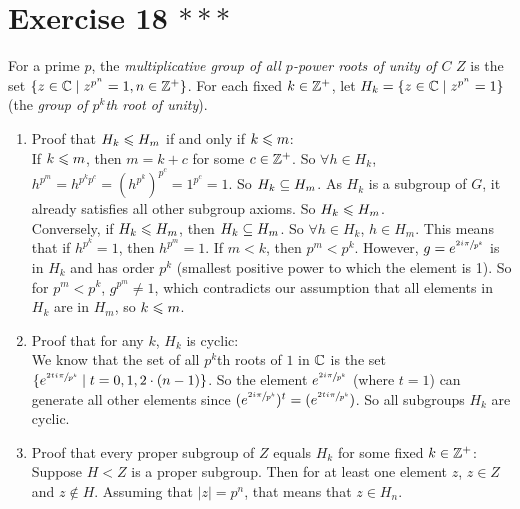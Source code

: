 \documentclass[12pt]{article}
\begin{document}
    \section*{Exercise 18 $***$}
    For a prime $p$,
    the \textit{multiplicative group of all $p$-power roots of unity of $C$}
    $Z$ is the set $\{z \in \mathbb{C} \mid z^{p^n} = 1, n \in \mathbb{Z}^+\}$.
    For each fixed $k \in \mathbb{Z}^+$, let $H_k = \{z \in \mathbb{C} \mid z^{p^n} = 1\}$
    (the \textit{group of $p^k$th root of unity}).
    \begin{enumerate}[label=\textbf{\alph*.}]
        \item
            Proof that $H_k \leqslant H_m$ if and only if $k \leqslant m$: \\
            If $k \leqslant m$, then $m = k + c$ for some $c \in \mathbb{Z}^+$.
            So $\forall h \in H_k$,
            $h^{p^m} = h^{p^kp^c} = (h^{p^k})^{p^c} = 1^{p^c} = 1$.
            So $H_k \subseteq H_m$.
            As $H_k$ is a subgroup of $G$, it already satisfies all other 
            subgroup axioms.
            So $H_k \leqslant H_m$. \\
            Conversely, if $H_k \leqslant H_m$,
            then $H_k \subseteq H_m$.
            So $\forall h \in H_k$, $h \in H_m$.
            This means that if $h^{p^k} = 1$, then $h^{p^m} = 1$.
            If $m < k$, then $p^m < p^k$.
            However, $g = e^{\sfrac{2i\pi}{p^k}}$ is in $H_k$
            and has order $p^k$
            (smallest positive power to which the element is 1).
            So for $p^m < p^k$, $g^{p^m} \neq 1$,
            which contradicts our assumption that all elements in $H_k$
            are in $H_m$,
            so $k \leqslant m$. 
        \item
            Proof that for any $k$, $H_k$ is cyclic: \\
            We know that the set of all $p^k$th roots of $1$ in $\mathbb{C}$
            is the set
            $\{ e^{\sfrac{2ti\pi}{p^k}} \mid t = 0, 1, 2 \cdot (n-1) \}$.
            So the element $e^{\sfrac{2i\pi}{p^k}}$ (where $t = 1$)
            can generate all other elements
            since $(e^{\sfrac{2i\pi}{p^k}})^t = (e^{\sfrac{2ti\pi}{p^k}})$.
            So all subgroups $H_k$ are cyclic.
        \item
            Proof that every proper subgroup of $Z$ equals $H_k$
            for some fixed $k \in \mathbb{Z}^+$: \\
            Suppose $H < Z$ is a proper subgroup.
            Then for at least one element $z$, $z \in Z$ and $z \notin H$.
            Assuming that $|z| = p^n$,
            that means that $z \in H_n$.

\end{enumerate}
\end{document}
